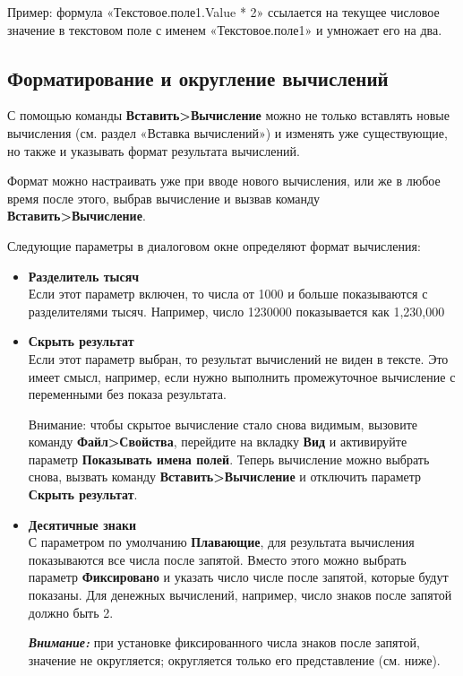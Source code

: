 ﻿\documentclass[a4paper,10pt]{article}
\begin{document}
 Пример: формула «Текстовое.поле1.Value * 2» ссылается на текущее числовое значение в текстовом поле с именем «Текстовое.поле1» и умножает его на два.

\subsection{Форматирование и округление вычислений}
С помощью команды \textbf{Вставить>Вычисление} можно не только вставлять новые вычисления (см. раздел «Вставка вычислений») и изменять уже существующие, но также и указывать формат результата вычислений.

Формат можно настраивать уже при вводе нового вычисления, или же в любое время после этого, выбрав вычисление и вызвав команду \textbf{Вставить>Вычисление}.

Следующие параметры в диалоговом окне определяют формат вычисления:

\begin{itemize}
 \item \textbf{Разделитель тысяч}\\
 Если этот параметр включен, то числа от 1000 и больше показываются с разделителями тысяч. Например, число 1230000 показывается как 1,230,000
 \item \textbf{Скрыть результат}\\
 Если этот параметр выбран, то результат вычислений не виден в тексте. Это имеет смысл, например, если нужно выполнить промежуточное вычисление с переменными без показа результата.
 
 Внимание: чтобы скрытое вычисление стало снова видимым, вызовите команду \textbf{Файл>Свойства}, перейдите на вкладку \textbf{Вид} и активируйте параметр \textbf{Показывать имена полей}. Теперь вычисление можно выбрать снова, вызвать команду \textbf{Вставить>Вычисление} и отключить параметр \textbf{Скрыть результат}.
 \item \textbf{Десятичные знаки}\\
 С параметром по умолчанию \textbf{Плавающие}, для результата вычисления показываются все числа после запятой. Вместо этого можно выбрать параметр \textbf{Фиксировано} и указать число числе после запятой, которые будут показаны. Для денежных вычислений, например, число знаков после запятой должно быть 2.
 
 \textbf{\textit{Внимание:}} при установке фиксированного числа знаков после запятой, значение не округляется; округляется только его представление (см. ниже).
\end{itemize}
\end{document}
